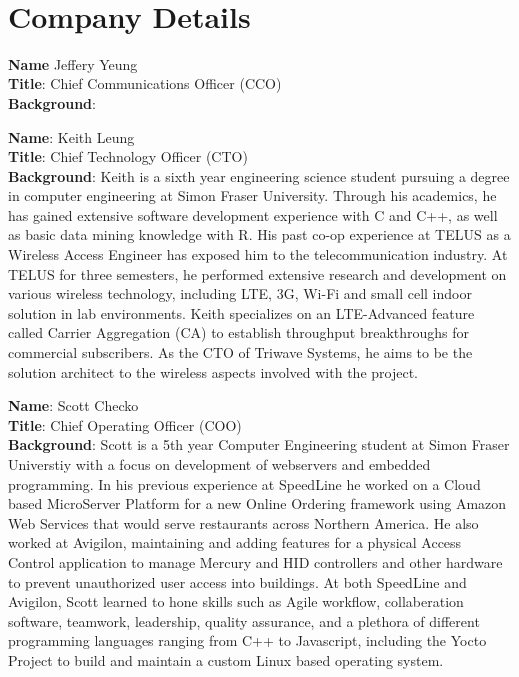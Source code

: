 

\setcounter{section}{5}
\
\section{Company Details}

\bigskip
\textbf{Name} Jeffery Yeung \\
\medskip
\textbf{Title}: Chief Communications Officer (CCO)\\
\medskip
\textbf{Background}:

\bigskip
\bigskip
\textbf{Name}:  Keith Leung\\
\medskip
\textbf{Title}: Chief Technology Officer (CTO) \\
\medskip
\textbf{Background}:
Keith is a sixth year engineering science student pursuing a degree in computer engineering at Simon Fraser University. Through his academics, he has gained extensive software development experience with C and C++, as well as basic data mining knowledge with R. His past co-op experience at TELUS as a Wireless Access Engineer has exposed him to the telecommunication industry. At TELUS for three semesters, he performed extensive research and development on various wireless technology, including LTE, 3G, Wi-Fi and small cell indoor solution in lab environments. Keith specializes on an LTE-Advanced feature called Carrier Aggregation (CA) to establish throughput breakthroughs for commercial subscribers. As the CTO of Triwave Systems, he aims to be the solution architect to the wireless aspects involved with the project.

\bigskip
\bigskip
\textbf{Name}: Scott Checko\\
\medskip
\textbf{Title}: Chief Operating Officer (COO)\\
\medskip
\textbf{Background}:
Scott is a 5th year Computer Engineering student at Simon Fraser Universtiy with a focus on development of webservers and embedded programming.
In his previous experience at SpeedLine he worked on a Cloud based MicroServer Platform for a new Online Ordering framework using Amazon Web Services that would serve restaurants across Northern America.
He also worked at Avigilon, maintaining and adding features for a physical Access Control application to manage Mercury and HID controllers and other hardware to prevent unauthorized user access into buildings.
At both SpeedLine and Avigilon, Scott learned to hone skills such as Agile workflow, collaberation software, teamwork, leadership, quality assurance, and a plethora of different programming languages ranging from C++ to Javascript, including the Yocto Project to build and maintain a custom Linux based operating system.


